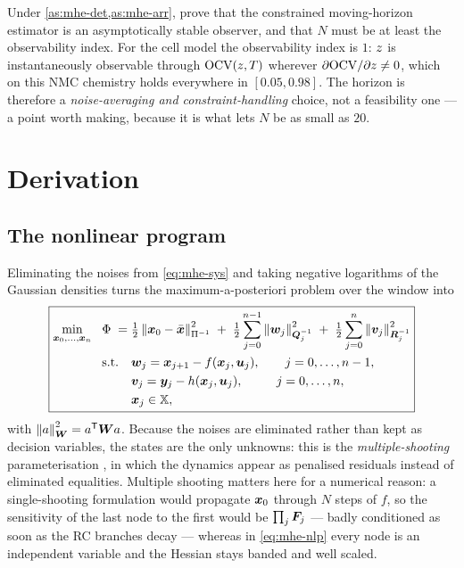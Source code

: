Under \cref{as:mhe-det,as:mhe-arr}, \citet[Thm.~4]{rao2003mhe} prove that the constrained
moving-horizon estimator is an asymptotically stable observer, and that $N$ must be at least the
observability index.  For the cell model the observability index is $1$: $z$ is instantaneously
observable through $\mathrm{OCV}(z,T)$ wherever $\partial\mathrm{OCV}/\partial z\neq 0$, which on this NMC
chemistry holds everywhere in $[0.05,0.98]$.  The horizon is therefore a \emph{noise-averaging and
constraint-handling} choice, not a feasibility one --- a point worth making, because it is what
lets $N$ be as small as $20$.

\section{Derivation}

\subsection{The nonlinear program}
Eliminating the noises from \cref{eq:mhe-sys} and taking negative logarithms of the Gaussian
densities turns the maximum-a-posteriori problem over the window into
\begin{equation}\label{eq:mhe-nlp}
\boxed{
\begin{aligned}
\min_{\bm{x}_0,\dots,\bm{x}_n}\ \ \Phi \;=\;
&\tfrac12\left\lVert \bm{x}_0 - \bar{\bm{x}} \right\rVert^2_{\Pi^{-1}}
\;+\;\tfrac12\sum_{j=0}^{n-1}\left\lVert \bm{w}_j \right\rVert^2_{\bm{Q}_j^{-1}}
\;+\;\tfrac12\sum_{j=0}^{n}\left\lVert \bm{v}_j \right\rVert^2_{\bm{R}_j^{-1}} \\
\text{s.t.}\quad
&\bm{w}_j = \bm{x}_{j+1} - f(\bm{x}_j,\bm{u}_j),\qquad j = 0,\dots,n-1, \\
&\bm{v}_j = \bm{y}_j - h(\bm{x}_j,\bm{u}_j),\qquad\ \ j = 0,\dots,n, \\
&\bm{x}_j\in\mathbb{X},
\end{aligned}}
\end{equation}
with $\left\lVert a \right\rVert^2_{\bm{W}} = a^{\mathsf{T}}\bm{W} a$.  Because the noises are eliminated rather than kept as
decision variables, the states are the only unknowns: this is the \emph{multiple-shooting}
parameterisation \citep{bock1984multipleshooting}, in which the dynamics appear as penalised
residuals instead of eliminated equalities.  Multiple shooting matters here for a numerical reason:
a single-shooting formulation would propagate $\bm{x}_0$ through $N$ steps of $f$, so the sensitivity
of the last node to the first would be $\prod_j \bm{F}_j$ --- badly conditioned as soon as the RC
branches decay --- whereas in \cref{eq:mhe-nlp} every node is an independent variable and the
Hessian stays banded and well scaled.

